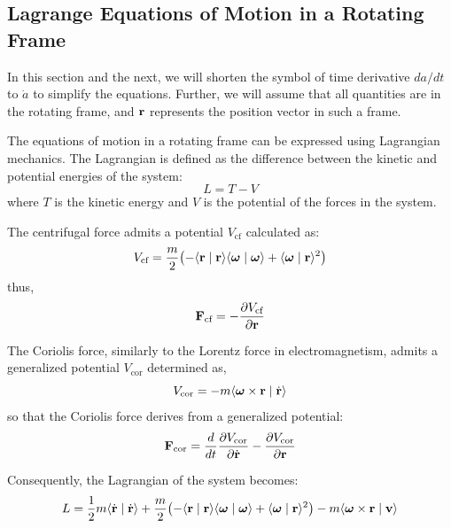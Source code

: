 \documentclass[12pt]{article}
\newcommand{\ip}[2]{\langle #1 \mid #2 \rangle}
\begin{document}
\subsection{Lagrange Equations of Motion in a Rotating Frame}

In this section and the next, we will shorten the symbol of time derivative $da/dt$ to
$\dot{a}$ to simplify the equations. Further, we will assume that all quantities are in the
rotating frame, and $\vb{r}$ represents the position vector in such a frame.

The equations of motion in a rotating frame can be expressed using Lagrangian mechanics. The
Lagrangian is defined as the difference between the kinetic and potential energies of the
system:
\begin{equation}
  L = T - V
\end{equation}
where $T$ is the kinetic energy and $V$ is the potential of the forces in the system.

The centrifugal force admits a potential $V_\text{cf}$ calculated as:
\begin{equation}
  V_\text{cf} = \frac{m}{2}\bigl(-\ip{\vb{r}}{\vb{r}}\ip{\boldsymbol{\omega}}{\boldsymbol{\omega}}
    + \ip{\boldsymbol{\omega}}{\vb{r}}^2\bigr)
\end{equation}
thus,
\begin{equation}
  \vb{F}_\text{cf} = -\frac{\partial V_\text{cf}}{\partial\vb{r}}
\end{equation}

The Coriolis force, similarly to the Lorentz force in electromagnetism, admits a generalized
potential $V_\text{cor}$ determined as,
\begin{equation}
  V_\text{cor} = -m\ip{\boldsymbol{\omega}\times\vb{r}}{\dot{\vb{r}}}
\end{equation}
so that the Coriolis force derives from a generalized potential:
\begin{equation}
  \vb{F}_\text{cor} = \frac{d}{dt}\frac{\partial V_\text{cor}}{\partial\dot{\vb{r}}}
    - \frac{\partial V_\text{cor}}{\partial\vb{r}}
\end{equation}

Consequently, the Lagrangian of the system becomes:
\begin{equation}
  L = \frac{1}{2}m\ip{\dot{\vb{r}}}{\dot{\vb{r}}}
    + \frac{m}{2}\bigl(-\ip{\vb{r}}{\vb{r}}\ip{\boldsymbol{\omega}}{\boldsymbol{\omega}}
      + \ip{\boldsymbol{\omega}}{\vb{r}}^2\bigr)
    - m\ip{\boldsymbol{\omega}\times\vb{r}}{\vb{v}}
\end{equation}
\end{document}
